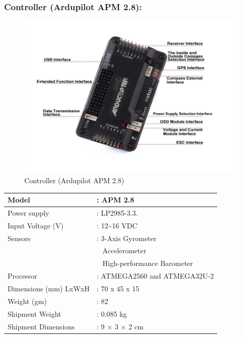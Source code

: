 \subsubsection{Controller (Ardupilot APM 2.8):}
\begin{figure}[h!]
\centering
\includegraphics[width=12cm]{./Figures/controller_qc.png}
\caption{Controller (Ardupilot APM 2.8)}
\label{controller_qc}
\end{figure}

\begin{table}[h!]
\centering
\begin{tabular}{|l|l|} 
\hline
Model                 & : APM 2.8                     \\ 
\hline
Power supply          & : LP2985-3.3.                 \\ 
\hline
Input Voltage (V)     & : 12\textasciitilde{}16 VDC   \\ 
\hline
Sensors               & : 3-Axis Gyrometer            \\ 
\hline
~                     & ~ Accelerometer               \\ 
\hline
~                     & ~ High-performance Barometer  \\ 
\hline
Processor             & : ATMEGA2560 and ATMEGA32U-2  \\ 
\hline
Dimensions (mm) LxWxH & : 70 x 45 x 15                \\ 
\hline
Weight (gm)           & : 82                          \\ 
\hline
Shipment Weight       & : 0.085 kg                    \\ 
\hline
Shipment Dimensions   & : 9 × 3 × 2 cm                \\
\hline
\end{tabular}
\end{table}

